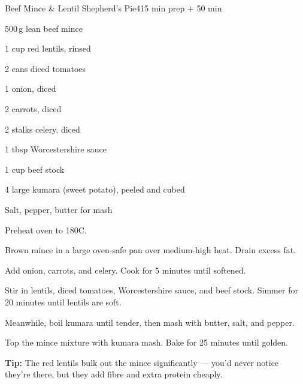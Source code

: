 \begin{recipebox}{Beef Mince \& Lentil Shepherd's Pie}{4}{15 min prep + 50 min}
\begin{ingredients}
  \item 500\,g lean beef mince
  \item 1 cup red lentils, rinsed
  \item 2 cans diced tomatoes
  \item 1 onion, diced
  \item 2 carrots, diced
  \item 2 stalks celery, diced
  \item 1 tbsp Worcestershire sauce
  \item 1 cup beef stock
  \item 4 large kumara (sweet potato), peeled and cubed
  \item Salt, pepper, butter for mash
\end{ingredients}

\begin{method}
  \item Preheat oven to 180\textdegree C.
  \item Brown mince in a large oven-safe pan over medium-high heat. Drain excess fat.
  \item Add onion, carrots, and celery. Cook for 5 minutes until softened.
  \item Stir in lentils, diced tomatoes, Worcestershire sauce, and beef stock. Simmer for 20 minutes until lentils are soft.
  \item Meanwhile, boil kumara until tender, then mash with butter, salt, and pepper.
  \item Top the mince mixture with kumara mash. Bake for 25 minutes until golden.
\end{method}

\begin{notelist}
  \item \textbf{Tip:} The red lentils bulk out the mince significantly --- you'd never notice they're there, but they add fibre and extra protein cheaply.
\end{notelist}
\end{recipebox}
